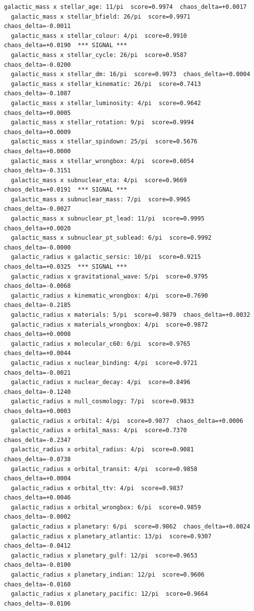 \documentclass[11pt, letterpaper, openany]{book}
\begin{document}
\begin{empiricalbox}
\begin{lstlisting}[style=terminal]
  galactic_mass x stellar_age: 11/pi  score=0.9974  chaos_delta=+0.0017
  galactic_mass x stellar_bfield: 26/pi  score=0.9971  chaos_delta=-0.0011
  galactic_mass x stellar_colour: 4/pi  score=0.9910  chaos_delta=+0.0190  *** SIGNAL ***
  galactic_mass x stellar_cycle: 26/pi  score=0.9587  chaos_delta=-0.0200
  galactic_mass x stellar_dm: 16/pi  score=0.9973  chaos_delta=+0.0004
  galactic_mass x stellar_kinematic: 26/pi  score=0.7413  chaos_delta=-0.1087
  galactic_mass x stellar_luminosity: 4/pi  score=0.9642  chaos_delta=+0.0005
  galactic_mass x stellar_rotation: 9/pi  score=0.9994  chaos_delta=+0.0009
  galactic_mass x stellar_spindown: 25/pi  score=0.5676  chaos_delta=+0.0000
  galactic_mass x stellar_wrongbox: 4/pi  score=0.6054  chaos_delta=-0.3151
  galactic_mass x subnuclear_eta: 4/pi  score=0.9669  chaos_delta=+0.0191  *** SIGNAL ***
  galactic_mass x subnuclear_mass: 7/pi  score=0.9965  chaos_delta=-0.0027
  galactic_mass x subnuclear_pt_lead: 11/pi  score=0.9995  chaos_delta=+0.0020
  galactic_mass x subnuclear_pt_sublead: 6/pi  score=0.9992  chaos_delta=-0.0000
  galactic_radius x galactic_sersic: 10/pi  score=0.9215  chaos_delta=+0.0325  *** SIGNAL ***
  galactic_radius x gravitational_wave: 5/pi  score=0.9795  chaos_delta=-0.0068
  galactic_radius x kinematic_wrongbox: 4/pi  score=0.7690  chaos_delta=-0.2185
  galactic_radius x materials: 5/pi  score=0.9879  chaos_delta=+0.0032
  galactic_radius x materials_wrongbox: 4/pi  score=0.9872  chaos_delta=+0.0008
  galactic_radius x molecular_c60: 6/pi  score=0.9765  chaos_delta=+0.0044
  galactic_radius x nuclear_binding: 4/pi  score=0.9721  chaos_delta=-0.0021
  galactic_radius x nuclear_decay: 4/pi  score=0.8496  chaos_delta=-0.1240
  galactic_radius x null_cosmology: 7/pi  score=0.9833  chaos_delta=+0.0003
  galactic_radius x orbital: 4/pi  score=0.9877  chaos_delta=+0.0006
  galactic_radius x orbital_mass: 4/pi  score=0.7370  chaos_delta=-0.2347
  galactic_radius x orbital_radius: 4/pi  score=0.9081  chaos_delta=-0.0738
  galactic_radius x orbital_transit: 4/pi  score=0.9858  chaos_delta=+0.0004
  galactic_radius x orbital_ttv: 4/pi  score=0.9837  chaos_delta=+0.0046
  galactic_radius x orbital_wrongbox: 6/pi  score=0.9859  chaos_delta=-0.0002
  galactic_radius x planetary: 6/pi  score=0.9862  chaos_delta=+0.0024
  galactic_radius x planetary_atlantic: 13/pi  score=0.9307  chaos_delta=-0.0412
  galactic_radius x planetary_gulf: 12/pi  score=0.9653  chaos_delta=-0.0100
  galactic_radius x planetary_indian: 12/pi  score=0.9606  chaos_delta=-0.0160
  galactic_radius x planetary_pacific: 12/pi  score=0.9664  chaos_delta=-0.0106

\end{lstlisting}
\end{empiricalbox}
\end{document}
